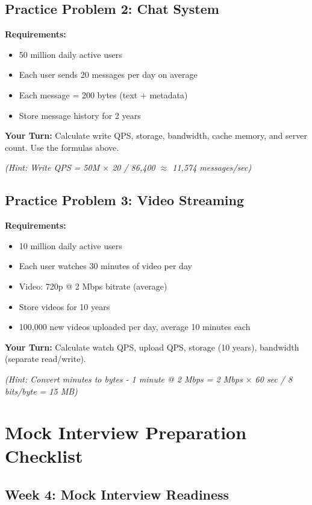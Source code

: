 \documentclass[10pt]{article}
\begin{document}
\subsection{Practice Problem 2: Chat System}

\textbf{Requirements:}
\begin{itemize}
\item 50 million daily active users
\item Each user sends 20 messages per day on average
\item Each message = 200 bytes (text + metadata)
\item Store message history for 2 years
\end{itemize}

\textbf{Your Turn:} Calculate write QPS, storage, bandwidth, cache memory, and server count. Use the formulas above.

\textit{(Hint: Write QPS = 50M $\times$ 20 / 86,400 $\approx$ 11,574 messages/sec)}

\subsection{Practice Problem 3: Video Streaming}

\textbf{Requirements:}
\begin{itemize}
\item 10 million daily active users
\item Each user watches 30 minutes of video per day
\item Video: 720p @ 2 Mbps bitrate (average)
\item Store videos for 10 years
\item 100,000 new videos uploaded per day, average 10 minutes each
\end{itemize}

\textbf{Your Turn:} Calculate watch QPS, upload QPS, storage (10 years), bandwidth (separate read/write).

\textit{(Hint: Convert minutes to bytes - 1 minute @ 2 Mbps = 2 Mbps $\times$ 60 sec / 8 bits/byte = 15 MB)}

\section{Mock Interview Preparation Checklist}

\subsection{Week 4: Mock Interview Readiness}
\end{document}
